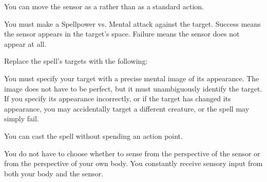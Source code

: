 
You can move the sensor as a  rather than as a standard action.







You must make a Spellpower vs. Mental attack against the target.
Success means the sensor appears in the target's space.
Failure means the sensor does not appear at all.



Replace the spell's targets with the following:
\begin{spellcontent}

\begin{augmenttargetinginfo}
\spellspecial
You must specify your target with a precise mental image of its appearance.
The image does not have to be perfect, but it must unambiguously identify the target.
If you specify its appearance incorrectly, or if the target has changed its appearance, you may accidentally target a different creature, or the spell may simply fail.




\end{augmenttargetinginfo}

\end{spellcontent}





You can cast the spell without spending an action point.






You do not have to choose whether to sense from the perspective of the sensor or from the perspective of your own body.
You constantly receive sensory input from both your body and the sensor.





